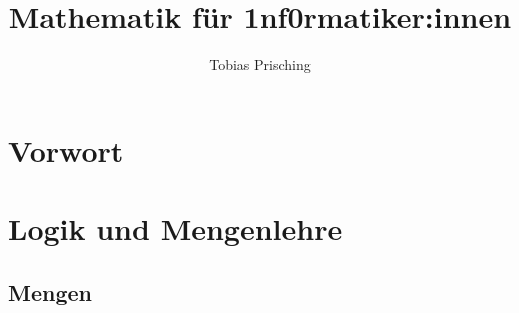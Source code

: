 \documentclass[a4paper,12pt,ngerman]{scrreprt}
\title{Mathematik für 1nf0rmatiker:innen}
\author{Tobias Prisching}
\date{ }
\begin{document}
	
	\maketitle
	
	\newpage

	\tableofcontents

	\newpage
	\chapter*{Vorwort}\label{Vorwort}
	
	
	\newpage
	\chapter{Logik und Mengenlehre}\label{L&M}

		\section{Mengen}\label{L&M:Mengen}
			
	
\end{document}
